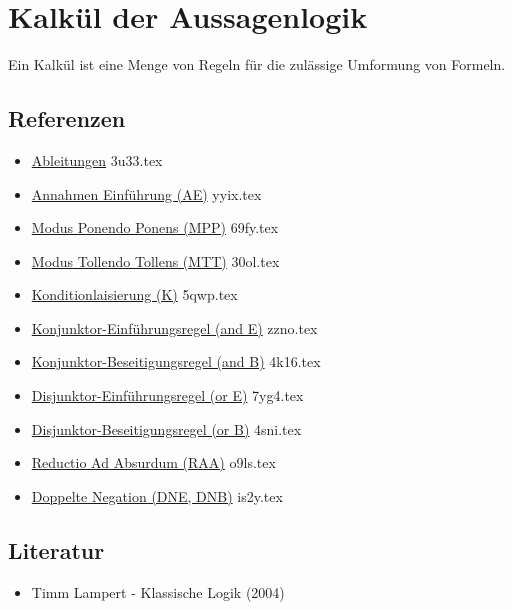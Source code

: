 \documentclass{sajzk}
\begin{document}
\section{Kalkül der Aussagenlogik} 
\label{8hkr}

Ein Kalkül ist eine Menge von Regeln für die zulässige Umformung von Formeln.

\subsection{Referenzen} 

\begin{itemize}
  \item \href{3u33.pdf}{Ableitungen} 3u33.tex
  \item \href{yyix.pdf}{Annahmen Einführung (AE)} yyix.tex
  \item \href{69fy.pdf}{Modus Ponendo Ponens (MPP)} 69fy.tex
  \item \href{30ol.pdf}{Modus Tollendo Tollens (MTT)} 30ol.tex
  \item \href{5qwp.pdf}{Konditionlaisierung (K)} 5qwp.tex
  \item \href{zzno.pdf}{Konjunktor-Einführungsregel (and E)} zzno.tex
  \item \href{4k16.pdf}{Konjunktor-Beseitigungsregel (and B)} 4k16.tex
  \item \href{7yg4.pdf}{Disjunktor-Einführungsregel (or E)} 7yg4.tex
  \item \href{4sni.pdf}{Disjunktor-Beseitigungsregel (or B)} 4sni.tex
  \item \href{o9ls.pdf}{Reductio Ad Absurdum (RAA)} o9ls.tex
  \item \href{is2y.pdf}{Doppelte Negation (DNE, DNB)} is2y.tex
\end{itemize}

\subsection{Literatur} 

\begin{itemize}
  \item Timm Lampert - Klassische Logik (2004)
\end{itemize}
\end{document}
